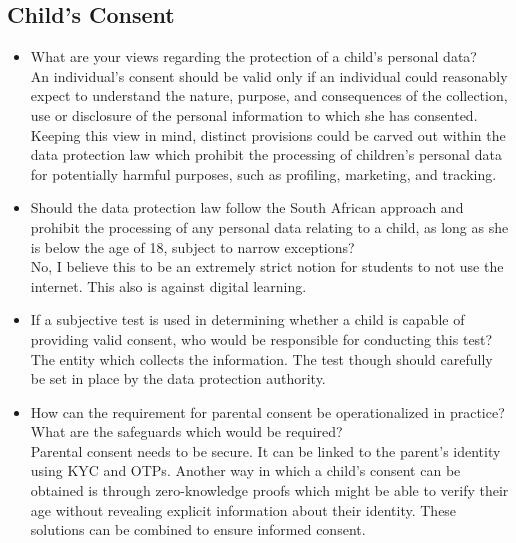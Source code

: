 \subsection{Child's Consent}
\begin{itemize}
\item What are your views regarding the protection of a child's personal data?
\\
An individual's consent should be valid only if an individual could reasonably expect to understand the nature, purpose, and consequences of the collection, use or disclosure of the personal information to which she has consented. Keeping this view in mind, distinct provisions could be carved out within the data protection law which prohibit the processing of children's personal data for potentially harmful purposes, such as profiling, marketing, and tracking.
\item Should the data protection law follow the South African approach and prohibit the processing of any personal data relating to a child, as long as she is below the age of 18, subject to narrow exceptions?
\\
No, I believe this to be an extremely strict notion for students to not use the internet. This also is against digital learning.
\item If a subjective test is used in determining whether a child is capable of providing valid consent, who would be responsible for conducting this test?
\\
The entity which collects the information. The test though should carefully be set in place by the data protection authority.
\item How can the requirement for parental consent be operationalized in practice? What are the safeguards which would be required?
\\
Parental consent needs to be secure. It can be linked to the parent's identity using KYC and OTPs. Another way in which a child's consent can be obtained is through zero-knowledge proofs which might be able to verify their age without revealing explicit information about their identity. These solutions can be combined to ensure informed consent.
\end{itemize}
